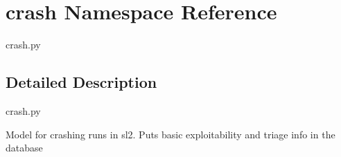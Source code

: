 \hypertarget{namespacecrash}{}\section{crash Namespace Reference}
\label{namespacecrash}


crash.\+py  




\subsection{Detailed Description}
crash.\+py 

Model for crashing runs in sl2. Puts basic exploitability and triage info in the database 